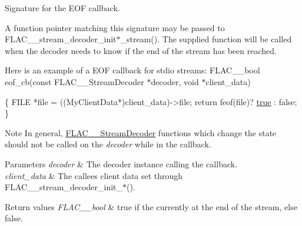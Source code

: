 Signature for the E\+OF callback.

A function pointer matching this signature may be passed to F\+L\+A\+C\+\_\+\+\_\+stream\+\_\+decoder\+\_\+init$\ast$\+\_\+stream(). The supplied function will be called when the decoder needs to know if the end of the stream has been reached.

Here is an example of a E\+OF callback for stdio streams\+: F\+L\+A\+C\+\_\+\+\_\+bool eof\+\_\+cb(const F\+L\+A\+C\+\_\+\+\_\+\+Stream\+Decoder $\ast$decoder, void $\ast$client\+\_\+data) 
\begin{DoxyCode}
\{
  FILE *file = ((MyClientData*)client\_data)->file;
  \textcolor{keywordflow}{return} feof(file)? \hyperlink{astdbool_8h_a41f9c5fb8b08eb5dc3edce4dcb37fee7}{true} : \textcolor{keyword}{false};
\}
\end{DoxyCode}


\begin{DoxyNote}{Note}
In general, \hyperlink{struct_f_l_a_c_____stream_decoder}{F\+L\+A\+C\+\_\+\+\_\+\+Stream\+Decoder} functions which change the state should not be called on the {\itshape decoder} while in the callback.
\end{DoxyNote}

\begin{DoxyParams}{Parameters}
{\em decoder} & The decoder instance calling the callback. \\
\hline
{\em client\+\_\+data} & The callee\textquotesingle{}s client data set through F\+L\+A\+C\+\_\+\+\_\+stream\+\_\+decoder\+\_\+init\+\_\+$\ast$(). \\
\hline
\end{DoxyParams}

\begin{DoxyRetVals}{Return values}
{\em F\+L\+A\+C\+\_\+\+\_\+bool} & {\ttfamily true} if the currently at the end of the stream, else {\ttfamily false}. \\
\hline
\end{DoxyRetVals}
\mbox{\label{group__flac__stream__decoder_gac896ee6a12668e9015fab4fbc6aae996}} 
